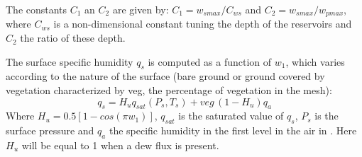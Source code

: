 The constants $C_{1}$ an $C_{2}$ are given by:
\newline
$C_{1}= w_{smax}/C_{ws}$ and $C_{2}=w_{smax}/w_{pmax}$,
\newline
where $C_{ws}$ is a non-dimensional constant tuning
the depth of the reservoirs and $C_{2}$ the ratio of these depth.

The surface specific humidity $q_{s}$ is computed as a function of $w_{1}$,
which varies according to the nature of the surface (bare ground or ground
covered by vegetation characterized by veg, the percentage of vegetation in
the mesh):
\begin{equation}
\label{eq25}
q_{s}=H_{u}q_{sat}\left( P_{s},T_{s} \right)+veg\, \left( 1-H_{u}
\right)q_{a}
\end{equation}
\newline
Where $H_{u}=0.5\left[ 1-cos\left( \pi w_{1} \right) \right]$,
\newline
$q_{sat}$ is the saturated value of $q_{s}$, $P_{s}$ is the surface pressure
\newline
and $q_{a}$ the specific humidity in the first level in the air in \CS.
\newline
Here $H_{u}$ will be equal to 1 when a dew flux is present.

